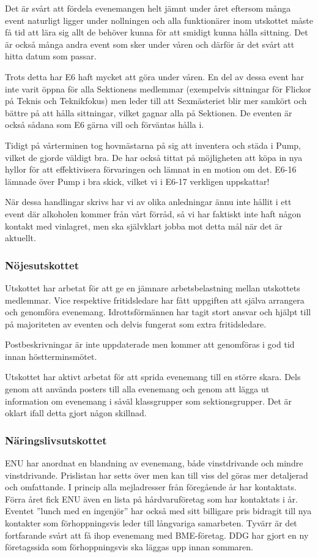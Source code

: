 \documentclass[../_main/handlingar.tex]{subfiles}
\begin{document}
Det är svårt att fördela evenemangen helt jämnt under året eftersom många event naturligt ligger under nollningen och alla funktionärer inom utskottet måste få tid att lära sig allt de behöver kunna för att smidigt kunna hålla sittning. Det är också många andra event som sker under våren och därför är det svårt att hitta datum som passar.

Trots detta har E6 haft mycket att göra under våren. En del av dessa event har inte varit öppna för alla Sektionens medlemmar (exempelvis sittningar för Flickor på Teknis och Teknikfokus) men leder till att Sexmästeriet blir mer samkört och bättre på att hålla sittningar, vilket gagnar alla på Sektionen. De eventen är också sådana som E6 gärna vill och förväntas hålla i.

Tidigt på vårterminen tog hovmästarna på sig att inventera och städa i Pump, vilket de gjorde väldigt bra. De har också tittat på möjligheten att köpa in nya hyllor för att effektivisera förvaringen och lämnat in en motion om det. E6-16 lämnade över Pump i bra skick, vilket vi i E6-17 verkligen uppskattar!

När dessa handlingar skrivs har vi av olika anledningar ännu inte hållit i ett event där alkoholen kommer från vårt förråd, så vi har faktiskt inte haft någon kontakt med vinlagret, men ska självklart jobba mot detta mål när det är aktuellt.

\subsubsection*{Nöjesutskottet}
Utskottet har arbetat för att ge en jämnare arbetsbelastning mellan utskottets medlemmar. Vice respektive fritidsledare har fått uppgiften att själva arrangera och genomföra evenemang. Idrottsförmännen har tagit stort ansvar och hjälpt till på majoriteten av eventen och delvis fungerat som extra fritidsledare.

Postbeskrivningar är inte uppdaterade men kommer att genomföras i god tid innan höstterminsmötet.

Utskottet har aktivt arbetat för att sprida evenemang till en större skara. Dels genom att använda posters till alla evenemang och genom att lägga ut information om evenemang i såväl klassgrupper som sektionsgrupper. Det är oklart ifall detta gjort någon skillnad.


\subsubsection*{Näringslivsutskottet}
ENU har anordnat en blandning av evenemang, både vinstdrivande och mindre vinstdrivande.  Prislistan har setts över men kan till viss del göras mer detaljerad och omfattande. I princip alla mejladresser från föregående år har kontaktats. Förra året fick ENU även en lista på hårdvaruföretag som har kontaktats i år. Eventet ”lunch med en ingenjör” har också med sitt billigare pris bidragit till nya kontakter som förhoppningsvis leder till långvariga samarbeten. Tyvärr är det fortfarande svårt att få ihop evenemang med BME-företag. DDG har gjort en ny företagssida som förhoppningsvis ska läggas upp innan sommaren.
\end{document}
